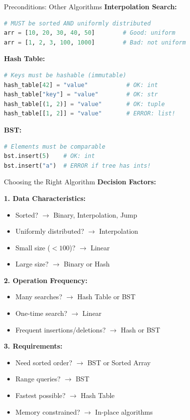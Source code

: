\documentclass[aspectratio=169]{beamer}
\begin{document}
\begin{frame}[fragile]{Preconditions: Other Algorithms}
\textbf{Interpolation Search:}
\begin{lstlisting}[language=Python, basicstyle=\ttfamily\small]
# MUST be sorted AND uniformly distributed
arr = [10, 20, 30, 40, 50]        # Good: uniform
arr = [1, 2, 3, 100, 1000]        # Bad: not uniform
\end{lstlisting}

\vspace{0.3cm}
\textbf{Hash Table:}
\begin{lstlisting}[language=Python, basicstyle=\ttfamily\small]
# Keys must be hashable (immutable)
hash_table[42] = "value"           # OK: int
hash_table["key"] = "value"        # OK: str
hash_table[(1, 2)] = "value"       # OK: tuple
hash_table[[1, 2]] = "value"       # ERROR: list!
\end{lstlisting}

\vspace{0.3cm}
\textbf{BST:}
\begin{lstlisting}[language=Python, basicstyle=\ttfamily\small]
# Elements must be comparable
bst.insert(5)    # OK: int
bst.insert("a")  # ERROR if tree has ints!
\end{lstlisting}
\end{frame}

\begin{frame}{Choosing the Right Algorithm}
  \textbf{Decision Factors:}

  \vspace{0.3cm}
  \textbf{1. Data Characteristics:}
  \begin{itemize}
    \item Sorted? $\rightarrow$ Binary, Interpolation, Jump
    \item Uniformly distributed? $\rightarrow$ Interpolation
    \item Small size ($< 100$)? $\rightarrow$ Linear
    \item Large size? $\rightarrow$ Binary or Hash
  \end{itemize}

  \vspace{0.3cm}
  \textbf{2. Operation Frequency:}
  \begin{itemize}
    \item Many searches? $\rightarrow$ Hash Table or BST
    \item One-time search? $\rightarrow$ Linear
    \item Frequent insertions/deletions? $\rightarrow$ Hash or BST
  \end{itemize}

  \vspace{0.3cm}
  \textbf{3. Requirements:}
  \begin{itemize}
    \item Need sorted order? $\rightarrow$ BST or Sorted Array
    \item Range queries? $\rightarrow$ BST
    \item Fastest possible? $\rightarrow$ Hash Table
    \item Memory constrained? $\rightarrow$ In-place algorithms
  \end{itemize}
\end{frame}
\end{document}
